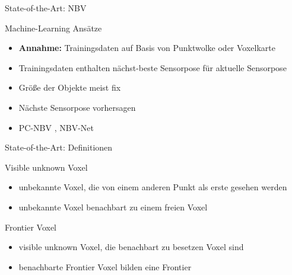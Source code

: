 \documentclass{beamer}
\begin{document}
\begin{frame}{State-of-the-Art: NBV}
	\begin{block}{Machine-Learning Ansätze}
		\begin{itemize}
			\item \textbf{Annahme:} Trainingsdaten auf Basis von Punktwolke oder Voxelkarte
			\item Trainingsdaten enthalten nächst-beste Sensorpose für aktuelle Sensorpose
			\item Größe der Objekte meist fix
			\item Nächste Sensorpose vorhersagen
			\item PC-NBV \cite{zeng_pc-nbv_2020}, NBV-Net \cite{mendoza_supervised_2020}

		\end{itemize}
	\end{block}
\end{frame}

\begin{frame}{State-of-the-Art: Definitionen}
	\begin{exampleblock}{Visible unknown Voxel}
		\begin{itemize}
			\item unbekannte Voxel, die von einem anderen Punkt als erste gesehen werden
			\item unbekannte Voxel benachbart zu einem freien Voxel
		\end{itemize}
		\cite{vasquez-gomez_vpl_2020}
	\end{exampleblock}
	\begin{exampleblock}{Frontier Voxel}
		\begin{itemize}
			\item visible unknown Voxel, die benachbart zu besetzen Voxel sind
			\item benachbarte Frontier Voxel bilden eine Frontier

		\end{itemize}
		\cite{vasquez-gomez_vpl_2020}
	\end{exampleblock}
\end{frame}
\end{document}
